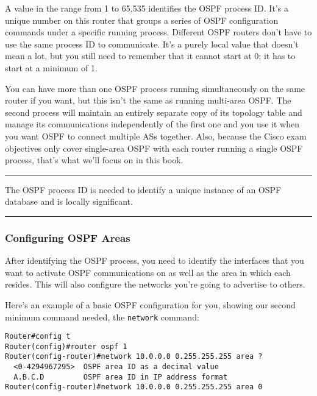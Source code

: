 A value in the range from 1 to 65,535 identifies the OSPF process ID.
It's a unique number on this router that groups a series of OSPF
configuration commands under a specific running process. Different OSPF
routers don't have to use the same process ID to communicate. It's a
purely local value that doesn't mean a lot, but you still need to
remember that it cannot start at 0; it has to start at a minimum of 1.

\protect\hypertarget{c18.xhtmlux5cux23Page_754}{}{}You can have more
than one OSPF process running simultaneously on the same router if you
want, but this isn't the same as running multi-area OSPF. The second
process will maintain an entirely separate copy of its topology table
and manage its communications independently of the first one and you use
it when you want OSPF to connect multiple ASs together. Also, because
the Cisco exam objectives only cover single-area OSPF with each router
running a single OSPF process, that's what we'll focus on in this book.

\begin{center}\rule{0.5\linewidth}{0.5pt}\end{center}

The OSPF process ID is needed to
identify a unique instance of an OSPF database and is locally
significant.

\begin{center}\rule{0.5\linewidth}{0.5pt}\end{center}

\subsubsection[Configuring OSPF
Areas]{\texorpdfstring{\protect\hypertarget{c18.xhtmlux5cux23c18-sec-7}{}{}Configuring
OSPF Areas}{Configuring OSPF Areas}}

After identifying the OSPF process, you need to identify the interfaces
that you want to activate OSPF communications on as well as the area in
which each resides. This will also configure the networks you're going
to advertise to others.

Here's an example of a basic OSPF configuration for you, showing our
second minimum command needed, the \texttt{network} command:

\begin{verbatim}
Router#config t
Router(config)#router ospf 1
Router(config-router)#network 10.0.0.0 0.255.255.255 area ?
  <0-4294967295>  OSPF area ID as a decimal value
  A.B.C.D         OSPF area ID in IP address format
Router(config-router)#network 10.0.0.0 0.255.255.255 area 0
\end{verbatim}

